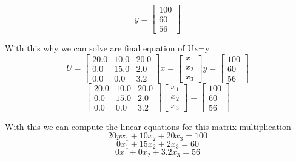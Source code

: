 \documentclass{article}
\begin{document}
\begin{enumerate}
\begin{center}
      \[
        y = 
        \begin{bmatrix}
          100 \\
          60 \\
          56
        \end{bmatrix}
      \]
    \end{center}
    \par
    With this why we can solve are final equation of Ux=y
    \[
      U = 
      \begin{bmatrix}
        20.0 & 10.0 & 20.0 \\
        0.0 & 15.0 & 2.0 \\
        0.0 & 0.0 & 3.2 
      \end{bmatrix}
      x = 
      \begin{bmatrix}
        x_1 \\
        x_2 \\
        x_3 
      \end{bmatrix}
      y = 
      \begin{bmatrix}
        100 \\
        60 \\
        56
      \end{bmatrix}
    \]
    \[
      \begin{bmatrix}
        20.0 & 10.0 & 20.0 \\
        0.0 & 15.0 & 2.0 \\
        0.0 & 0.0 & 3.2 
      \end{bmatrix}
      \begin{bmatrix}
        x_1 \\
        x_2 \\
        x_3 
      \end{bmatrix}
      =
      \begin{bmatrix}
        100 \\
        60 \\
        56
      \end{bmatrix}
    \]
    \par
    With this we can compute the linear equations for this matrix multiplication
    \begin{equation}
      20yx_1+10x_2+20x_3 = 100
    \end{equation}
    \begin{equation}
      0x_1+15x_2+2x_3 = 60
    \end{equation}
    \begin{equation}
      0x_1+0x_2+3.2x_3 = 56
    \end{equation}

\end{enumerate}
\end{document}
